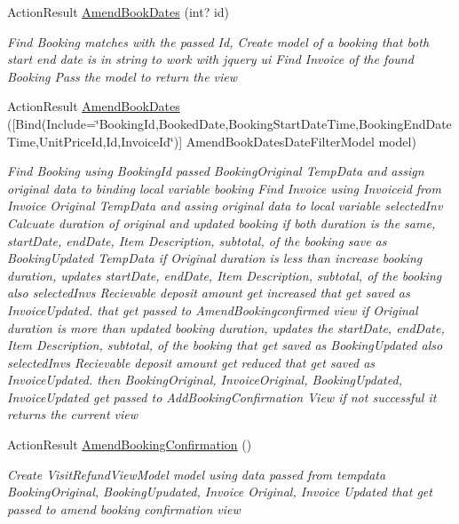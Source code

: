 \begin{DoxyCompactItemize}
Action\+Result \hyperlink{class_alfa_accounting_1_1_controllers_1_1_booking_view_models_controller_a0e2390ab528b31f0e6f08cb2e1e3b4d6}{Amend\+Book\+Dates} (int? id)
\begin{DoxyCompactList}\small\item\em Find Booking matches with the passed Id, Create model of a booking that both start end date is in string to work with jquery ui Find Invoice of the found Booking Pass the model to return the view \end{DoxyCompactList}\item 
Action\+Result \hyperlink{class_alfa_accounting_1_1_controllers_1_1_booking_view_models_controller_ac7f71cbbf29ebdd1103368248f4f70f8}{Amend\+Book\+Dates} (\mbox{[}Bind(Include=\char`\"{}Booking\+Id,Booked\+Date,Booking\+Start\+Date\+Time,Booking\+End\+Date\+Time,Unit\+Price\+Id,Id,Invoice\+Id\char`\"{})\mbox{]} Amend\+Book\+Dates\+Date\+Filter\+Model model)
\begin{DoxyCompactList}\small\item\em Find Booking using Booking\+Id passed Booking\+Original Temp\+Data and assign original data to binding local variable booking Find Invoice using Invoiceid from Invoice Original Temp\+Data and assing original data to local variable selected\+Inv Calcuate duration of original and updated booking if both duration is the same, start\+Date, end\+Date, Item Description, subtotal, of the booking save as Booking\+Updated Temp\+Data if Original duration is less than increase booking duration, updates start\+Date, end\+Date, Item Description, subtotal, of the booking also selected\+Inv\textquotesingle{}s Recievable deposit amount get increased that get saved as Invoice\+Updated. that get passed to Amend\+Bookingconfirmed view if Original duration is more than updated booking duration, updates the start\+Date, end\+Date, Item Description, subtotal, of the booking that get saved as Booking\+Updated also selected\+Inv\textquotesingle{}s Recievable deposit amount get reduced that get saved as Invoice\+Updated. then Booking\+Original, Invoice\+Original, Booking\+Updated, Invoice\+Updated get passed to Add\+Booking\+Confirmation View if not successful it returns the current view \end{DoxyCompactList}\item 
Action\+Result \hyperlink{class_alfa_accounting_1_1_controllers_1_1_booking_view_models_controller_afb2e1c7475bb061d45f7a810f5420d75}{Amend\+Booking\+Confirmation} ()
\begin{DoxyCompactList}\small\item\em Create Visit\+Refund\+View\+Model model using data passed from tempdata Booking\+Original, Booking\+Upudated, Invoice Original, Invoice Updated that get passed to amend booking confirmation view \end{DoxyCompactList}\item 

\end{DoxyCompactItemize}
